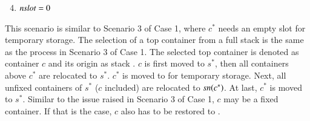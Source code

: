 \documentclass[review,3p,times,authoryear,12pt]{elsarticle}
\begin{document}
\begin{enumerate}
\setcounter{enumi}{3}
\item $\id{nslot}=0$
\end{enumerate}
This scenario is similar to Scenario 3 of Case 1, where $c^*$ needs an empty slot for temporary storage. The selection of a top container from a full stack is the same as the process in Scenario 3 of Case 1. The selected top container is denoted as container $c$ and its origin as stack . $c$ is first moved to $s^*$, then all containers above $c^*$ are relocated to $s^*$. $c^*$ is moved to  for temporary storage. Next, all unfixed containers of $s^*$ ($c$ included) are relocated to $\id{sn}(c^*)$. At last, $c^*$ is moved to $s^*$. Similar to the issue raised in Scenario 3 of Case 1, $c$ may be a fixed container. If that is the case, $c$ also has to be restored to .
\end{document}

